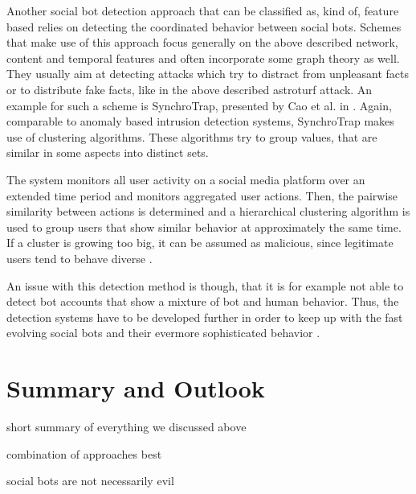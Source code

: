 Another social bot detection approach that can be classified as, kind of, feature based relies on detecting the coordinated behavior between social bots. Schemes that make use of this approach focus generally on the above described network, content and temporal features and often incorporate some graph theory as well. They usually aim at detecting attacks which try to distract from unpleasant facts or to distribute fake facts, like in the above described astroturf attack.  An example for such a scheme is SynchroTrap, presented by Cao et al. in \cite{synchrotrap}. Again, comparable to anomaly based intrusion detection systems, SynchroTrap makes use of clustering algorithms. These algorithms try to group values, that are similar in some aspects into distinct sets. 

The system monitors all user activity on a social media platform over an extended time period and monitors aggregated user actions. Then, the pairwise similarity between actions is determined and a hierarchical clustering algorithm is used to group users that show similar behavior at approximately the same time. If a cluster is growing too big, it can be assumed as malicious, since legitimate users tend to behave diverse \cite{synchrotrap}.

An issue with this detection method is though, that it is for example not able to detect bot accounts that show a mixture of bot and human behavior. Thus, the detection systems have to be developed further in order to keep up with the fast evolving social bots and their evermore sophisticated behavior \cite{ferrara15}.


\section{Summary and Outlook}

short summary of everything we discussed above

combination of approaches best

social bots are not necessarily evil


























\newpage
